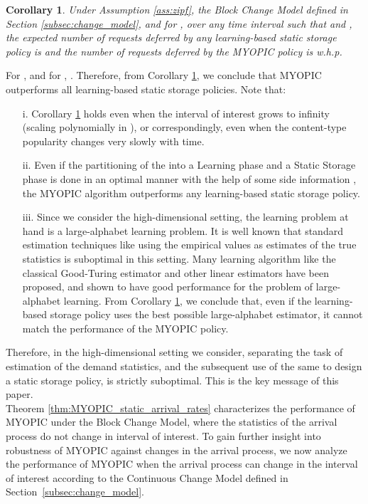 \documentclass[10pt, conference, letterpaper]{IEEEtran}
\newtheorem{corollary}{Corollary}
\begin{document}
\begin{corollary}
	\label{cor:MYOPIC_static_arrival_rates}
	Under Assumption \ref{ass:zipf}, the Block Change Model defined in
	Section \ref{subsec:change_model}, and for , over any time
	interval  such that  and , the expected number of requests deferred by
	any learning-based static storage policy is   and the
	number of requests deferred by the MYOPIC policy is 
	w.h.p.
\end{corollary}

For ,  and for ,  . Therefore,
from Corollary \ref{cor:MYOPIC_static_arrival_rates}, we conclude that
MYOPIC outperforms all learning-based static storage policies. Note
that:
\begin{itemize}
	\item[i.] Corollary \ref{cor:MYOPIC_static_arrival_rates} holds even
	when the interval of interest  grows to infinity (scaling
	polynomially in ), or correspondingly, even when the content-type
	popularity changes very slowly with time.
	
	\item[ii.] Even if the partitioning of the  into a Learning
	phase and a Static Storage phase is done in an optimal manner with
	the help of some side information , the MYOPIC
	algorithm outperforms any learning-based static storage policy.
	
	\item[iii.] Since we consider the high-dimensional setting, the
	learning problem at hand is a large-alphabet learning problem. It is
	well known that standard estimation techniques like using the
	empirical values as estimates of the true statistics is suboptimal
	in this setting. Many learning algorithm like the classical
	Good-Turing estimator \cite{MS00} and other linear estimators
	\cite{VV11} have been proposed, and shown to have good performance
	for the problem of large-alphabet learning. From Corollary
	\ref{cor:MYOPIC_static_arrival_rates}, we conclude that, even if the
	learning-based storage policy uses the best possible large-alphabet
	estimator, it cannot match the performance of the MYOPIC policy.
\end{itemize}


Therefore, in the high-dimensional setting we consider, separating the
task of estimation of the  demand statistics, and the subsequent use
of the same to design a static storage policy, is strictly
suboptimal. This is the key message of this paper.\\

Theorem \ref{thm:MYOPIC_static_arrival_rates} characterizes the
performance of MYOPIC under the Block Change Model, where the
statistics of the arrival process do not change in interval of
interest. To gain further insight into robustness of MYOPIC against
changes in the arrival process, we now analyze the performance of
MYOPIC when the arrival process can change in the interval of interest
according to the Continuous Change Model defined in
Section~\ref{subsec:change_model}.
\end{document}
